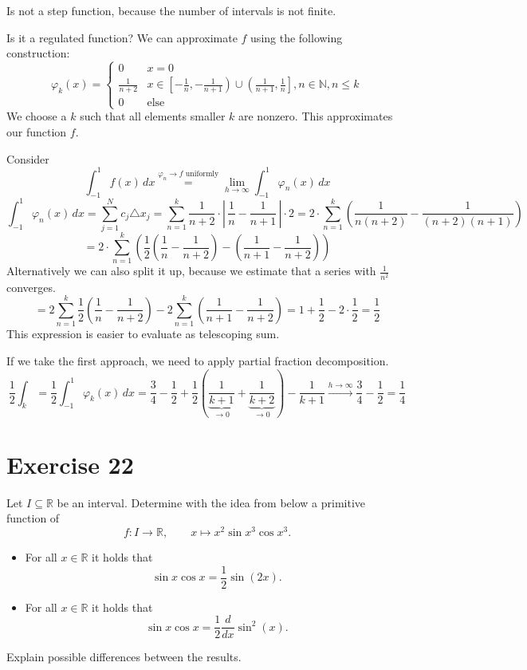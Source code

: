 \documentclass[a4paper]{article}
\theoremstyle{definition}
\newcommand\abs[1]{\left|\,#1\,\right|}
\begin{document}
Is not a step function, because the number of intervals is not finite.

Is it a regulated function? We can approximate $f$ using the following construction:
\[
  \varphi_k(x) = \begin{cases}
    0 & x = 0 \\
    \frac{1}{n+2}  & x \in \left[-\frac1n, -\frac1{n+1}\right) \cup \left(\frac1{n+1}, \frac1n\right], n \in \mathbb N, n \leq k \\
    0 & \text{else}
  \end{cases}
\]
We choose a $k$ such that all elements smaller $k$ are nonzero.
This approximates our function $f$.

Consider
\[
  \int_{-1}^1 f(x) \, dx \overset{\varphi_n \to f \text{ uniformly}}{=}
  \lim_{h\to\infty} \int_{-1}^1 \varphi_n(x) \, dx
\]
\[
  \int_{-1}^1 \varphi_n(x) \, dx
  = \sum_{j=1}^N c_j \triangle x_j
  = \sum_{n=1}^k \frac{1}{n+2} \cdot \abs{\frac1n - \frac1{n+1}} \cdot 2
  = 2 \cdot \sum_{n=1}^k \left(\frac{1}{n (n + 2)} - \frac{1}{(n + 2) (n + 1)}\right)
\] \[
  = 2 \cdot \sum_{n=1}^k \left(\frac12 \left(\frac1n - \frac1{n+2}\right) - \left(\frac1{n + 1} - \frac1{n+2}\right)\right)
\]
Alternatively we can also split it up, because we estimate that a series with $\frac1{n^2}$ converges.
\[
  = 2 \sum_{n=1}^k \frac12 \left(\frac1n - \frac1{n+2}\right)
  - 2 \sum_{n=1}^k \left(\frac{1}{n+1} - \frac{1}{n+2}\right)
  = 1 + \frac12 - 2 \cdot \frac12 = \frac12
\]
This expression is easier to evaluate as telescoping sum.

If we take the first approach, we need to apply partial fraction decomposition.
\[
  \frac12 \int_k = \frac12 \int_{-1}^1 \varphi_k(x) \, dx
  = \frac34 - \frac12 + \frac12 \left(\underbrace{\frac1{k+1}}_{\to 0} + \underbrace{\frac1{k+2}}_{\to 0}\right) - \frac{1}{k+1} \overset{h\to\infty}{\longrightarrow} \frac34 - \frac12 = \frac14
\]

\section{Exercise 22}
\begin{ex}
  Let $I \subseteq \mathbb R$ be an interval. Determine with the idea from below
  a primitive function of
  \[ f: I \to \mathbb R, \qquad x \mapsto x^2 \sin{x^3} \cos{x^3}. \]
  \begin{itemize}
    \item For all $x \in \mathbb R$ it holds that
      \[ \sin{x} \cos{x} = \frac12 \sin(2x). \]
    \item For all $x \in \mathbb R$ it holds that
      \[ \sin{x} \cos{x} = \frac12 \frac{d}{dx} \sin^2(x). \]
  \end{itemize}
  Explain possible differences between the results.
\end{ex}
\end{document}
